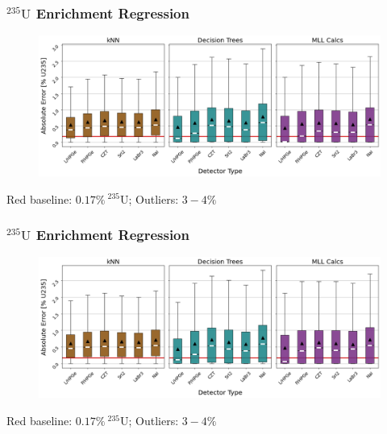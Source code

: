\begin{frame}
  \frametitle{${}^{235}\text{U}$ Enrichment Regression}
  \begin{adjustwidth}{-15pt}{-10pt}
  \begin{figure}
    \centering
    \includegraphics[width=1.1\textwidth]{./figures/abserror_boxplots_short_enri.png}
  \end{figure}
  \vspace{12pt} \centering Red baseline: $0.17\%\:{}^{235}\text{U}$; Outliers: $3-4\%$
  \end{adjustwidth}
\end{frame}

\begin{frame}
  \frametitle{${}^{235}\text{U}$ Enrichment Regression}
  \begin{adjustwidth}{-15pt}{-10pt}
  \begin{figure}
    \centering
    \includegraphics[width=1.1\textwidth]{./figures/abserror_boxplots_long_enri.png}
  \end{figure}
  \vspace{12pt} \centering Red baseline: $0.17\%\:{}^{235}\text{U}$; Outliers: $3-4\%$
  \end{adjustwidth}
\end{frame}

